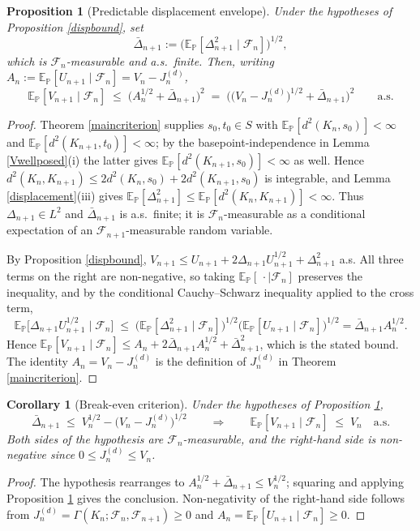\documentclass{article}
\newcommand{\E}{\mathbb{E}_{\mathbb{P}}}
\newcommand{\F}{\mathcal{F}}
\newcommand{\1}{\mathbbm{1}}
\newtheorem{prop}{Proposition}
\newtheorem{cor}{Corollary}
\begin{document}
\begin{prop}[Predictable displacement envelope]
\label{dispenvelope}
Under the hypotheses of Proposition \ref{dispbound}, set
\[
\bar\Delta_{n+1}:=\big(\E[\Delta_{n+1}^2\mid\F_n]\big)^{1/2},
\]
which is $\F_n$-measurable and a.s.\ finite. Then, writing
$A_n:=\E[U_{n+1}\mid\F_n]=V_n-J_n^{(d)}$,
\[
\E[V_{n+1}\mid\F_n]\;\le\;\Big(A_n^{1/2}+\bar\Delta_{n+1}\Big)^{2}
\;=\;\Big(\big(V_n-J_n^{(d)}\big)^{1/2}+\bar\Delta_{n+1}\Big)^{2}
\qquad\text{a.s.}
\]
\end{prop}

\begin{proof}
Theorem \ref{maincriterion} supplies $s_0,t_0\in S$ with $\E[d^2(K_n,s_0)]<\infty$ and
$\E[d^2(K_{n+1},t_0)]<\infty$; by the basepoint-independence in Lemma \ref{Vwellposed}(i) the
latter gives $\E[d^2(K_{n+1},s_0)]<\infty$ as well. Hence
$d^2(K_n,K_{n+1})\le2d^2(K_n,s_0)+2d^2(K_{n+1},s_0)$ is integrable, and Lemma
\ref{displacement}(iii) gives $\E[\Delta_{n+1}^2]\le\E[d^2(K_n,K_{n+1})]<\infty$. Thus
$\Delta_{n+1}\in L^2$ and $\bar\Delta_{n+1}$ is a.s.\ finite; it is $\F_n$-measurable as a
conditional expectation of an $\F_{n+1}$-measurable random variable.

By Proposition \ref{dispbound}, $V_{n+1}\le U_{n+1}+2\Delta_{n+1}U_{n+1}^{1/2}+\Delta_{n+1}^2$ a.s.
All three terms on the right are non-negative, so taking $\E[\,\cdot\mid\F_n]$ preserves the
inequality, and by the conditional Cauchy--Schwarz inequality applied to the cross term,
\[
\E\big[\Delta_{n+1}U_{n+1}^{1/2}\mid\F_n\big]
\;\le\;\big(\E[\Delta_{n+1}^2\mid\F_n]\big)^{1/2}\big(\E[U_{n+1}\mid\F_n]\big)^{1/2}
=\bar\Delta_{n+1}A_n^{1/2}.
\]
Hence $\E[V_{n+1}\mid\F_n]\le A_n+2\bar\Delta_{n+1}A_n^{1/2}+\bar\Delta_{n+1}^2$, which is the
stated bound. The identity $A_n=V_n-J_n^{(d)}$ is the definition of $J_n^{(d)}$ in Theorem
\ref{maincriterion}.
\end{proof}

\begin{cor}[Break-even criterion]
\label{breakeven}
Under the hypotheses of Proposition \ref{dispenvelope},
\[
\bar\Delta_{n+1}\;\le\;V_n^{1/2}-\big(V_n-J_n^{(d)}\big)^{1/2}
\qquad\Longrightarrow\qquad
\E[V_{n+1}\mid\F_n]\;\le\;V_n\quad\text{a.s.}
\]
Both sides of the hypothesis are $\F_n$-measurable, and the right-hand side is non-negative since
$0\le J_n^{(d)}\le V_n$.
\end{cor}

\begin{proof}
The hypothesis rearranges to $A_n^{1/2}+\bar\Delta_{n+1}\le V_n^{1/2}$; squaring and applying
Proposition \ref{dispenvelope} gives the conclusion. Non-negativity of the right-hand side follows
from $J_n^{(d)}=\Gamma(K_n;\F_n,\F_{n+1})\ge0$ and $A_n=\E[U_{n+1}\mid\F_n]\ge0$.
\end{proof}
\end{document}
